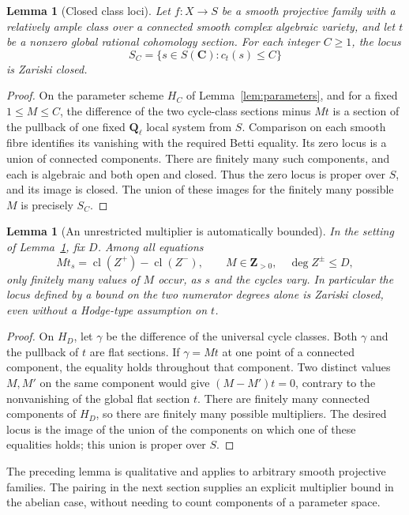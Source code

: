 \documentclass[11pt]{article}
\newtheorem{lemma}[theorem]{Lemma}
\theoremstyle{definition}
\theoremstyle{remark}
\newcommand{\Q}{\mathbf Q}
\newcommand{\Z}{\mathbf Z}
\newcommand{\C}{\mathbf C}
\newcommand{\cl}{\operatorname{cl}}
\begin{document}
\begin{lemma}[Closed class loci]\label{lem:closed}
Let $f:X\to S$ be a smooth projective family with a relatively ample class over a connected smooth complex algebraic variety, and let $t$ be a nonzero global rational cohomology section. For each integer $C\geq1$, the locus
\[
 S_C=\{s\in S(\C):c_t(s)\leq C\}
\]
is Zariski closed.
\end{lemma}

\begin{proof}
On the parameter scheme $H_C$ of Lemma~\ref{lem:parameters}, and for a fixed $1\leq M\leq C$, the difference of the two cycle-class sections minus $Mt$ is a section of the pullback of one fixed $\Q_\ell$ local system from $S$. Comparison on each smooth fibre identifies its vanishing with the required Betti equality. Its zero locus is a union of connected components. There are finitely many such components, and each is algebraic and both open and closed. Thus the zero locus is proper over $S$, and its image is closed. The union of these images for the finitely many possible $M$ is precisely $S_C$.
\end{proof}

\begin{lemma}[An unrestricted multiplier is automatically bounded]\label{lem:components-multiplier}
In the setting of Lemma~\ref{lem:closed}, fix $D$. Among all equations
\[
 Mt_s=\cl(Z^+)-\cl(Z^-),\qquad
 M\in\Z_{>0},\quad \deg Z^\pm\leq D,
\]
only finitely many values of $M$ occur, as $s$ and the cycles vary. In particular the locus defined by a bound on the two numerator degrees alone is Zariski closed, even without a Hodge-type assumption on $t$.
\end{lemma}

\begin{proof}
On $H_D$, let $\gamma$ be the difference of the universal cycle classes. Both $\gamma$ and the pullback of $t$ are flat sections. If $\gamma=Mt$ at one point of a connected component, the equality holds throughout that component. Two distinct values $M,M'$ on the same component would give $(M-M')t=0$, contrary to the nonvanishing of the global flat section $t$. There are finitely many connected components of $H_D$, so there are finitely many possible multipliers. The desired locus is the image of the union of the components on which one of these equalities holds; this union is proper over $S$.
\end{proof}

The preceding lemma is qualitative and applies to arbitrary smooth projective families. The pairing in the next section supplies an explicit multiplier bound in the abelian case, without needing to count components of a parameter space.
\end{document}
